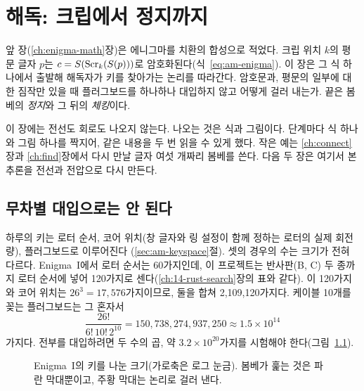 \chapter{해독: 크립에서 정지까지}\label{ch:cryptanalysis}

앞 장(\ref{ch:enigma-math}장)은 에니그마를 치환의 합성으로 적었다. 크립 위치 $k$의 평문 글자 $p$는
$c = S(\mathrm{Scr}_k(S(p)))$로 암호화된다(식~\eqref{eq:am-enigma}). 이 장은 그 식 하나에서 출발해 해독자가 키를
찾아가는 논리를 따라간다. 암호문과, 평문의 일부에 대한 짐작만 있을 때 플러그보드를 하나하나 대입하지 않고
어떻게 걸러 내는가. 끝은 봄베의 \emph{정지}와 그 뒤의 \emph{체킹}이다.

이 장에는 전선도 회로도 나오지 않는다. 나오는 것은 식과 그림이다. 단계마다 식 하나와 그림 하나를 짝지어, 같은 내용을
두 번 읽을 수 있게 했다. 작은 예는 \ref{ch:connect}장과 \ref{ch:find}장에서 다시 만날 글자 여섯 개짜리 봄베를 쓴다.
다음 두 장은 여기서 본 추론을 전선과 전압으로 다시 만든다.

\section{무차별 대입으로는 안 된다}\label{sec:ac-brute}

\Why 하루의 키는 로터 순서, 코어 위치(창 글자와 링 설정이 함께 정하는 로터의 실제 회전량), 플러그보드로 이루어진다
(\ref{sec:am-keyspace}절). 셋의 경우의 수는 크기가 전혀 다르다. Enigma~I에서 로터 순서는 60가지인데, 이 프로젝트는
반사판(B, C) 두 종까지 로터 순서에 넣어 120가지로 센다(\ref{ch:14-rust-search}장의 표와 같다). 이 120가지와 코어 위치는 $26^3 = 17{,}576$가지이므로, 둘을 합쳐 2,109,120가지다. 케이블 10개를 꽂는 플러그보드는
그 혼자서
\[
  \frac{26!}{6!\,10!\,2^{10}} = 150{,}738{,}274{,}937{,}250 \approx 1.5 \times 10^{14}
\]
가지다. 전부를 대입하려면 두 수의 곱, 약 $3.2 \times 10^{20}$가지를 시험해야 한다(그림~\ref{fig:ac-keyspace}).

\begin{figure}[ht]
\centering
{}
\caption{Enigma~I의 키를 나눈 크기(가로축은 로그 눈금). 봄베가 훑는 것은 파란 막대뿐이고, 주황 막대는 논리로 걸러 낸다.}
\label{fig:ac-keyspace}
\end{figure}

